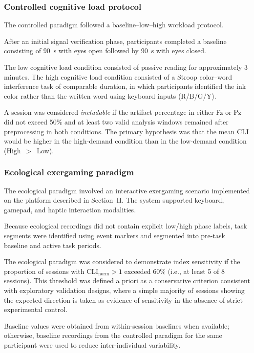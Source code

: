 \documentclass[10pt]{iopart}
\begin{document}
\subsubsection{Controlled cognitive load protocol}

The controlled paradigm followed a baseline--low--high workload protocol.

After an initial signal verification phase, participants completed a baseline consisting of 90~s with eyes open followed by 90~s with eyes closed.

The low cognitive load condition consisted of passive reading for approximately 3 minutes. The high cognitive load condition consisted of a Stroop color--word interference task of comparable duration, in which participants identified the ink color rather than the written word using keyboard inputs (R/B/G/Y).

A session was considered \emph{includable} if the artifact
percentage in either Fz or Pz did not exceed 50\% and at least
two valid analysis windows remained after preprocessing in both
conditions. The primary hypothesis was that the mean
$\mathrm{CLI}$ would be higher in the high-demand condition
than in the low-demand condition (High~$>$~Low).

\subsubsection{Ecological exergaming paradigm}
\label{sec:ecological_paradigm}

The ecological paradigm involved an interactive exergaming scenario implemented on the platform described in Section~II. The system supported keyboard, gamepad, and haptic interaction modalities.

Because ecological recordings did not contain explicit low/high
phase labels, task segments were identified using event markers
and segmented into pre-task baseline and active task periods.

The ecological paradigm was considered to demonstrate index
sensitivity if the proportion of sessions with
$\mathrm{CLI}_{\mathrm{norm}} > 1$ exceeded 60\% (i.e., at least
5 of 8 sessions). This threshold was defined a priori as a
conservative criterion consistent with exploratory validation
designs, where a simple majority of sessions showing the expected
direction is taken as evidence of sensitivity in the absence of
strict experimental control.

Baseline values were obtained from within-session baselines when available; otherwise, baseline recordings from the controlled paradigm for the same participant were used to reduce inter-individual variability.
\end{document}
